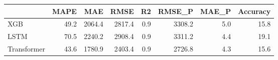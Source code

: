 \begin{tabular}{lrrrrrrr}
\toprule
{} &  MAPE &    MAE &   RMSE &  R2 &  RMSE\_P &  MAE\_P &  Accuracy \\
\midrule
XGB         &  49.2 & 2064.4 & 2817.4 & 0.9 &  3308.2 &    5.0 &      15.8 \\
LSTM        &  70.5 & 2240.2 & 2908.4 & 0.9 &  3311.2 &    4.4 &      19.1 \\
Transformer &  43.6 & 1780.9 & 2403.4 & 0.9 &  2726.8 &    4.3 &      15.6 \\
\bottomrule
\end{tabular}

